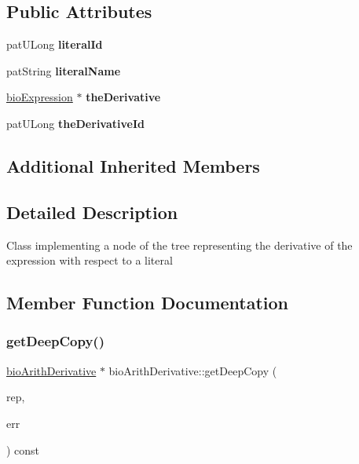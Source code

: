 \subsection*{Public Attributes}
\begin{DoxyCompactItemize}
\item 
\mbox{\label{classbio_arith_derivative_abb84824917aa60b8294c76b9aa066f64}} 
pat\+U\+Long {\bfseries literal\+Id}
\item 
\mbox{\label{classbio_arith_derivative_ad4397ec6e219c288783253ac1dd73823}} 
pat\+String {\bfseries literal\+Name}
\item 
\mbox{\label{classbio_arith_derivative_a8f3bdc79d73d03343d0a96739e6cd8ba}} 
\hyperlink{classbio_expression}{bio\+Expression} $\ast$ {\bfseries the\+Derivative}
\item 
\mbox{\label{classbio_arith_derivative_a3563c317f42fc8b934e96dae0679c4c5}} 
pat\+U\+Long {\bfseries the\+Derivative\+Id}
\end{DoxyCompactItemize}
\subsection*{Additional Inherited Members}


\subsection{Detailed Description}
Class implementing a node of the tree representing the derivative of the expression with respect to a literal 

\subsection{Member Function Documentation}
\mbox{\label{classbio_arith_derivative_a9cbc5395703b23816d43580b5482f9f0}} 
\subsubsection{\texorpdfstring{get\+Deep\+Copy()}{getDeepCopy()}}
{\footnotesize\ttfamily \hyperlink{classbio_arith_derivative}{bio\+Arith\+Derivative} $\ast$ bio\+Arith\+Derivative\+::get\+Deep\+Copy (\begin{DoxyParamCaption}\item[{\hyperlink{classbio_expression_repository}{bio\+Expression\+Repository} $\ast$}]{rep,  }\item[{pat\+Error $\ast$\&}]{err }\end{DoxyParamCaption}) const\hspace{0.3cm}{\ttfamily [virtual]}}

